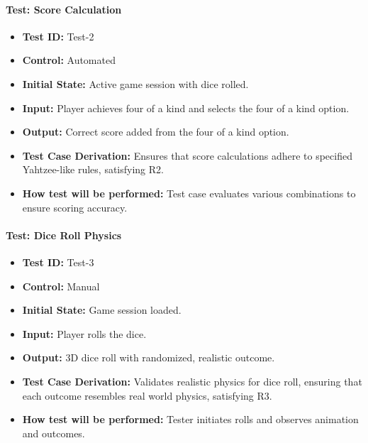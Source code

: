 \documentclass[12pt, titlepage]{article}
\begin{document}
\paragraph{\label{test-2}Test: Score Calculation}
\begin{itemize}
    \item \textbf{Test ID:} Test-2
    \item \textbf{Control:} Automated
    \item \textbf{Initial State:} Active game session with dice rolled.
    \item \textbf{Input:} Player achieves four of a kind and selects the four of a kind option.
    \item \textbf{Output:} Correct score added from the four of a kind option.
    \item \textbf{Test Case Derivation:} Ensures that score calculations adhere to specified Yahtzee-like rules, satisfying R2.
    \item \textbf{How test will be performed:} Test case evaluates various combinations to ensure scoring accuracy.
\end{itemize}

\paragraph{\label{test-3}Test: Dice Roll Physics}
\begin{itemize}
    \item \textbf{Test ID:} Test-3
    \item \textbf{Control:} Manual
    \item \textbf{Initial State:} Game session loaded.
    \item \textbf{Input:} Player rolls the dice.
    \item \textbf{Output:} 3D dice roll with randomized, realistic outcome.
    \item \textbf{Test Case Derivation:} Validates realistic physics for dice roll, ensuring that each outcome resembles real world physics, satisfying R3.
    \item \textbf{How test will be performed:} Tester initiates rolls and observes animation and outcomes.
\end{itemize}
\end{document}
